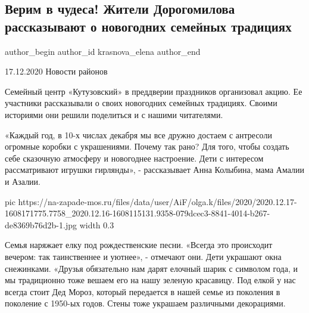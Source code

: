 
 
 
 
 
 
\subsection{Верим в чудеса! Жители Дорогомилова рассказывают о новогодних семейных традициях}
\label{sec:17_12_2020.news.ru.zapad_moskva.krasnova_elena.1.dogomilov_chudesa_deti}
\ifcmt
  author_begin
   author_id krasnova_elena
  author_end
\fi

17.12.2020 Новости районов

Семейный центр «Кутузовский» в преддверии праздников организовал акцию. Ее
участники рассказывали о своих новогодних семейных традициях. Своими историями
они решили поделиться и с нашими читателями.

«Каждый год, в 10-х числах декабря мы все дружно достаем с антресоли огромные
коробки с украшениями. Почему так рано? Для того, чтобы создать себе сказочную
атмосферу и новогоднее настроение. Дети с интересом рассматривают игрушки
гирлянды», - рассказывает Анна Колыбина, мама Амалии и Азалии.

\ifcmt
  pic https://na-zapade-mos.ru/files/data/user/AiF/olga.k/files/2020/2020.12.17-1608171775.7758_2020.12.16-1608115131.9358-079dcec3-8841-4014-b267-de8369b76d2b-1.jpg
  width 0.3
  
\fi


Семья наряжает елку под рождественские песни. «Всегда это происходит вечером:
так таинственнее и уютнее», - отмечают они. Дети украшают окна снежинками.
«Друзья обязательно нам дарят елочный шарик с символом года, и мы традиционно
тоже вешаем его на нашу зеленую красавицу. Под елкой у нас всегда стоит Дед
Мороз, который передается в нашей семье из поколения в поколение с 1950-ых
годов. Стены тоже украшаем различными декорациями.

